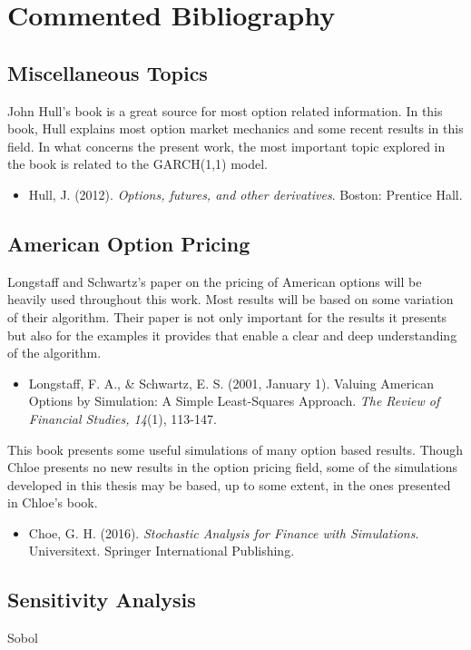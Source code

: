 \documentclass[a4paper,prd,twocolumn,nofootinbib,superscriptaddress,floatfix]{revtex4}
\begin{document}
\section{Commented Bibliography}
\subsection{Miscellaneous Topics}
John Hull's book is a great source for most option related information. In this book, Hull explains most option market mechanics and some recent results in this field. In what concerns the present work, the most important topic explored in the book is related to the GARCH(1,1) model.
\begin{itemize}
\item Hull, J. (2012). \textit{Options, futures, and other derivatives}. Boston: Prentice Hall.
\end{itemize}

\subsection{American Option Pricing}
Longstaff and Schwartz's paper on the pricing of American options will be heavily used throughout this work. Most results will be based on some variation of their algorithm. Their paper is not only important for the results it presents but also for the examples it provides that enable a clear and deep understanding of the algorithm.
\begin{itemize}
\item Longstaff, F. A., \& Schwartz, E. S. (2001, January 1). Valuing American Options by Simulation: A Simple Least-Squares Approach. \textit{The Review of Financial Studies, 14}(1), 113-147.
\end{itemize}

This book presents some useful simulations of many option based results. Though Chloe presents no new results in the option pricing field, some of the simulations developed in this thesis may be based, up to some extent, in the ones presented in Chloe's book.
\begin{itemize}
\item Choe, G. H. (2016). \textit{Stochastic Analysis for Finance with Simulations}. Universitext. Springer International Publishing. 
\end{itemize}

\subsection{Sensitivity Analysis}
Sobol
\end{document}
